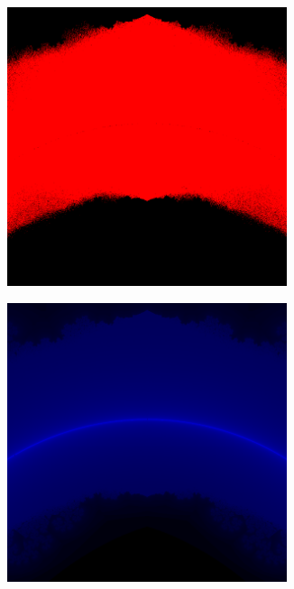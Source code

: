 \documentclass{article}
\begin{document}
\begin{figure}[!h]
 \caption{Zoom $3.7975$, gecentreerd rond $z = -0.0658328 + 0.914028 i$}
 \begin{subfigure}{0.49\textwidth}
  \includegraphics[width=0.9\textwidth]{elegant-gl/scrsh/left_10}
 \end{subfigure}
 \begin{subfigure}{0.49\textwidth}
  \includegraphics[width=0.9\textwidth]{elegant-gl/scrsh/right_10}
 \end{subfigure}
\end{figure}
\end{document}
